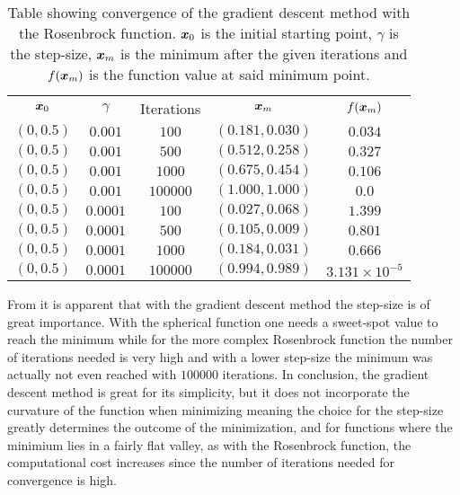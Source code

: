         \begin{table}[H]
            \centering
            \setlength{\tabcolsep}{24.5pt}
            \caption{Table showing convergence of the gradient descent method
            with the Rosenbrock function. $\boldsymbol{{x}}_0$ is the initial starting
            point, $\gamma$ is the step-size, $\boldsymbol{{x}}_m$ is the minimum after
            the given iterations and $f(\boldsymbol{{x}}_m)$ is the function value at
            said minimum point.}
            \label{tab:rosenbrockconv}
            \begin{tabular}{ccccc} \hline\hline
                $\boldsymbol{{x}}_0$ & $\gamma$ & Iterations & $\boldsymbol{{x}}_m$ & $f(\boldsymbol{{x}}_m)$ \\
                $(0,0.5)$ & $0.001$ & $100$ & $(0.181,0.030)$ & $0.034$ \\
                $(0,0.5)$ & $0.001$ & $500$ & $(0.512,0.258)$ & $0.327$ \\
                $(0,0.5)$ & $0.001$ & $1000$ & $(0.675,0.454)$ & $0.106$ \\
                $(0,0.5)$ & $0.001$ & $100000$ & $(1.000,1.000) $ & $0.0$ \\
                $(0,0.5)$ & $0.0001$ & $100$ & $(0.027,0.068)$ & $1.399$ \\
                $(0,0.5)$ & $0.0001$ & $500$ & $(0.105,0.009)$ & $0.801$ \\
                $(0,0.5)$ & $0.0001$ & $1000$ & $(0.184,0.031)$ & $0.666$ \\
                $(0,0.5)$ & $0.0001$ & $100000$ & $(0.994,0.989)$ & $3.131\times10^{-5}$ \\ \hline\hline
            \end{tabular}
        \end{table}
    From  it is apparent that with
    the gradient descent method the step-size is of great importance. With the
    spherical function one needs a sweet-spot value to reach the minimum while
    for the more complex Rosenbrock function the number of iterations needed is
    very high and with a lower step-size the minimum was actually not even
    reached with $100000$ iterations. In conclusion, the gradient descent
    method is great for its simplicity, but it does not incorporate the
    curvature of the function when minimizing meaning the choice for the
    step-size greatly determines the outcome of the minimization, and for
    functions where the minimium lies in a fairly flat valley, as with the
    Rosenbrock function, the computational cost increases since the number of
    iterations needed for convergence is high.

